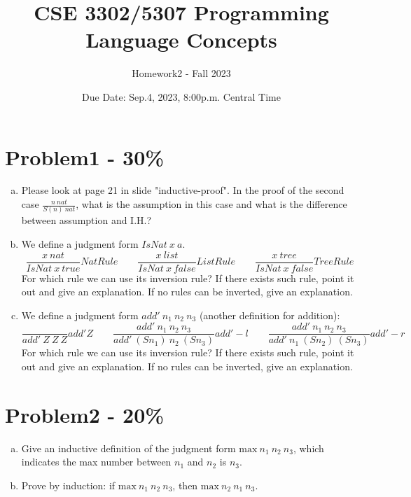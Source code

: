 \documentclass{article}
\begin{document}
\title{CSE 3302/5307 Programming Language Concepts}
\author{Homework2 - Fall 2023}
\date{Due Date: Sep.4, 2023, 8:00p.m. Central Time}
\maketitle
\thispagestyle{fancy}


\section*{Problem1 - 30\%}
\fontsize{12pt}{0}
\begin{enumerate}[(a)]
	\item Please look at page 21 in slide "inductive-proof". In the proof of the second case $\frac{n\ nat}{S(n)\ nat}$, what is the assumption in this case and what is the difference between assumption and I.H.?
	
	\item We define a judgment form $IsNat\ x\ a$.
	\[
	\frac{x\ nat}{IsNat\ x\ true}NatRule
	\qquad
	\frac{x\ list}{IsNat\ x\ false}ListRule
	\qquad
	\frac{x\ tree}{IsNat\ x\ false}TreeRule
	\]
	For which rule we can use its inversion rule? If there exists such rule, point it out and give an explanation. If no rules can be inverted, give an explanation.
	
	\item We define a judgment form $add'\ n_{1}\ n_{2}\ n_{3}$ (another definition for addition):
	\[
	\frac{}{add'\ Z\ Z\ Z}add'Z
	\qquad
	\frac{add'\ n_{1}\ n_{2}\ n_{3}}{add'\ (S n_{1})\ n_{2}\ (S n_{3})}add'-l
	\qquad
	\frac{add'\ n_{1}\ n_{2}\ n_{3}}{add'\ n_{1}\ (S n_{2})\ (S n_{3})}add'-r
	\]
	For which rule we can use its inversion rule? If there exists such rule, point it out and give an explanation. If no rules can be inverted, give an explanation. 
	
\end{enumerate}

\section*{Problem2 - 20\%}

\begin{enumerate}[(a)]
    \item Give an inductive definition of the judgment form
    $\mbox{max}\ n_1\ n_2\ n_3$, which indicates the max number between $n_1$ and $n_2$ is $n_3$.
    \item Prove by induction:
    if $\mbox{max}\ n_1\ n_2\ n_3$, then  $\mbox{max}\ n_2\ n_1\ n_3$.
\end{enumerate}
\end{document}

